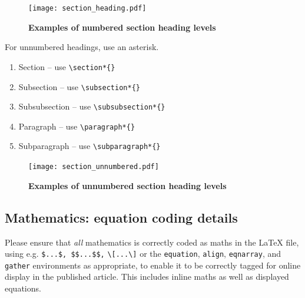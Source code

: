 \documentclass[11pt]{article}
\begin{document}
\begin{figure}[!h]
\vspace*{-12pt}
\centerline{\texttt{[image: section\_heading.pdf]}}
\centerline{\bf Examples of numbered section heading levels}
\end{figure}


\noindent For unnumbered headings, use an asterisk.
\begin{enumerate}
\item[] Section -- use \verb"\section*{}"
\item[] Subsection -- use \verb"\subsection*{}"
\item[] Subsubsection -- use \verb"\subsubsection*{}"
\item[] Paragraph -- use \verb"\paragraph*{}"
\item[] Subparagraph -- use \verb"\subparagraph*{}"
\end{enumerate}

\begin{figure}[!t]
\vspace*{-18pt}
\centerline{\texttt{[image: section\_unnumbered.pdf]}}
\centerline{\bf Examples of unnumbered section heading levels}
\end{figure}


\subsection{Mathematics: equation coding details}

Please ensure that {\it all} mathematics is correctly coded as maths in the LaTeX f{i}le, using e.g. \verb|$...$, $$...$$,| \verb|\[...\]| or the \verb"equation", \verb"align", \verb"eqnarray", and \verb"gather" environments as appropriate, to enable it to be correctly tagged for online display in the published article. This includes inline maths as well as displayed equations.
\end{document}
